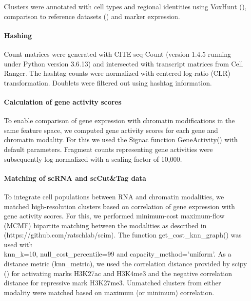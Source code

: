 Clusters were annotated with cell types and regional identities using VoxHunt (\cite{fleck_resolving_2021}), comparison to reference datasets (\cite{kanton_organoid_2019,fleck_inferring_2021}) and marker expression.

\paragraph{Hashing}
Count matrices were generated with CITE-seq-Count (version 1.4.5 running under Python version 3.6.13) and intersected with transcript matrices from Cell Ranger. The hashtag counts were normalized with centered log-ratio (CLR) transformation. Doublets were filtered out using hashtag information. 

\paragraph{Calculation of gene activity scores}
To enable comparison of gene expression with chromatin modifications in the same feature space, we computed gene activity scores for each gene and chromatin modality. For this we used the Signac function GeneActivity() with default parameters. Fragment counts representing gene activities were subsequently log-normalized with a scaling factor of 10,000. 

\paragraph{Matching of scRNA and scCut\&Tag data}
To integrate cell populations between RNA and chromatin modalities, we matched high-resolution clusters based on correlation of gene expression with gene activity scores. For this, we performed minimum-cost maximum-flow (MCMF) bipartite matching between the modalities as described in \cite{stark_scim_2020} \\(https://github.com/ratschlab/scim). The function get\_cost\_knn\_graph() was used with \\knn\_k=10, null\_cost\_percentile=99 and capacity\_method='uniform'. As a distance metric (knn\_metric), we used the correlation distance provided by scipy (\cite{virtanen_scipy_2020}) for activating marks H3K27ac and H3K4me3 and the negative correlation distance for repressive mark H3K27me3. Unmatched clusters from either modality were matched based on maximum (or minimum) correlation. 


